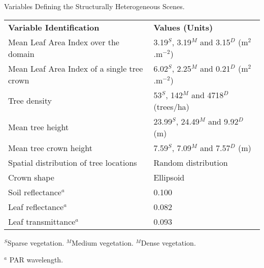 \begin{threeparttable}
\centering
\caption{Variables Defining the Structurally Heterogeneous Scenes.}
\begin{tabular}{l{} l{}}
     \hline
     \hline
\textbf{Variable Identification}   & \textbf{Values (Units)}\\
\noalign{\smallskip}\hline
Mean Leaf Area Index over the domain         &	3.19$^S$, 3.19$^M$ and 3.15$^D$ (m$^2$.m$^{-2}$)\\
Mean Leaf Area Index of a single tree crown  &	6.02$^S$, 2.25$^M$ and 0.21$^D$ (m$^2$.m$^{-2}$)\\
Tree density 	                             & 53$^S$, 142$^M$ and 4718$^D$ (trees/ha)\\
Mean tree height	                     &23.99$^S$, 24.49$^M$ and 9.92$^D$ (m)\\
Mean tree crown height	                     &7.59$^S$, 7.09$^M$ and 7.57$^D$ (m)\\
Spatial distribution of tree locations	     & Random distribution\\
Crown shape	                             & Ellipsoid\\
Soil reflectance$^a$	                     & 0.100\\
Leaf reflectance$^a$	                     & 0.082\\
Leaf transmittance$^a$ 	                     & 0.093\\
\hline
\hline%
\end{tabular}
\begin{tablenotes}
      \small
      \item $^S$Sparse vegetation. $^M$Medium vegetation. $^M$Dense vegetation. 
      \item $^a$ PAR wavelength. 
\end{tablenotes}
\label{tab:parameters_laisense}
\end{threeparttable}

\bigskip

